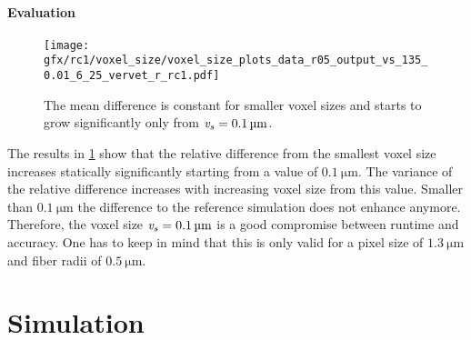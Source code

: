 \paragraph{Evaluation}
%
\begin{figure}[!t]
\centering
\texttt{[image: gfx/rc1/voxel\_size/voxel\_size\_plots\_data\_r05\_output\_vs\_135\_0.01\_6\_25\_vervet\_r\_rc1.pdf]}
\caption{The mean difference is constant for smaller voxel sizes and starts to grow significantly only from $\voxelsize=\SI{0.1}{\micro\meter}$.}
\label{fig:voxelsizeNoise}
\end{figure}
% 
The results in \cref{fig:voxelsizeNoise} show that the relative difference from the smallest voxel size increases statically significantly starting from a value of $\SI{0.1}{\micro\meter}$.
The variance of the relative difference increases with increasing voxel size from this value.
Smaller than $\SI{0.1}{\micro\meter}$ the difference to the reference simulation does not enhance anymore.
Therefore, the voxel size $\voxelsize = \SI{0.1}{\micro\meter}$ is a good compromise between runtime and accuracy.
One has to keep in mind that this is only valid for a pixel size of $\SI{1.3}{\micro\meter}$ and fiber radii of $\SI{0.5}{\micro\meter}$.
% 
%
%
\newpage
\section{Simulation}
%

